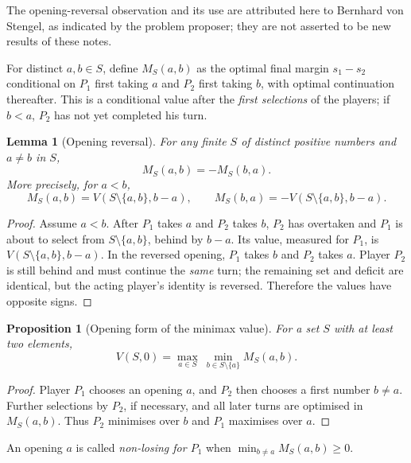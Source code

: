 \documentclass[11pt,a4paper]{article}
\newtheorem{proposition}[theorem]{Proposition}
\newtheorem{lemma}[theorem]{Lemma}
\theoremstyle{definition}
\theoremstyle{remark}
\begin{document}
\noindent
The opening-reversal observation and its use are attributed here to
Bernhard von Stengel, as indicated by the problem proposer; they are
not asserted to be new results of these notes.

For distinct $a,b\in S$, define $M_S(a,b)$ as the optimal final
margin $s_1-s_2$ conditional on $P_1$ first taking $a$ and $P_2$
first taking $b$, with optimal continuation thereafter.  This is a
conditional value after the \emph{first selections} of the players;
if $b<a$, $P_2$ has not yet completed his turn.

\begin{lemma}[Opening reversal]
\label{lem:reverse}
For any finite $S$ of distinct positive numbers and $a\ne b$ in $S$,
\begin{equation}\label{eq:antisym}
\boxed{M_S(a,b)=-M_S(b,a).}
\end{equation}
More precisely, for $a<b$,
\[
M_S(a,b)=V(S\setminus\{a,b\},b-a),
\qquad
M_S(b,a)=-V(S\setminus\{a,b\},b-a).
\]
\end{lemma}
\begin{proof}
Assume $a<b$.  After $P_1$ takes $a$ and $P_2$ takes $b$,
$P_2$ has overtaken and $P_1$ is about to select from
$S\setminus\{a,b\}$, behind by $b-a$.  Its value, measured for $P_1$,
is $V(S\setminus\{a,b\},b-a)$.  In the reversed opening, $P_1$
takes $b$ and $P_2$ takes $a$.  Player $P_2$ is still behind and must
continue the \emph{same} turn; the remaining set and deficit are
identical, but the acting player's identity is reversed.  Therefore
the values have opposite signs.
\end{proof}

\begin{proposition}[Opening form of the minimax value]
\label{prop:matrix}
For a set $S$ with at least two elements,
\begin{equation}\label{eq:matrix}
\boxed{V(S,0)=\max_{a\in S}\ \min_{b\in S\setminus\{a\}}M_S(a,b).}
\end{equation}
\end{proposition}
\begin{proof}
Player $P_1$ chooses an opening $a$, and $P_2$ then chooses a first
number $b\ne a$.  Further selections by $P_2$, if necessary, and
all later turns are optimised in $M_S(a,b)$.  Thus $P_2$ minimises
over $b$ and $P_1$ maximises over $a$.
\end{proof}

An opening $a$ is called \emph{non-losing for $P_1$} when
$\min_{b\ne a}M_S(a,b)\ge0$.
\end{document}
